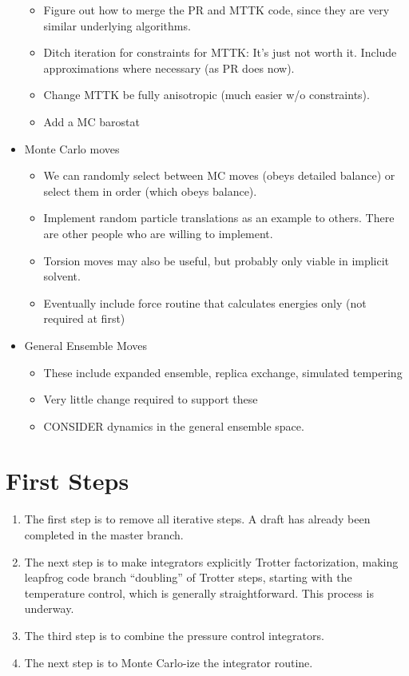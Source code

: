 \documentclass[11pt,a4paper,twoside]{article}
\begin{document}
\begin{itemize}
\begin{itemize}
     \item Figure out how to merge the PR and MTTK code, since they are very similar underlying algorithms.
     \item Ditch iteration for constraints for MTTK: It's just not
       worth it. Include approximations where necessary (as PR does
       now).
     \item Change MTTK be fully anisotropic (much easier w/o constraints).  
     \item Add a MC barostat
   \end{itemize}
\item Monte Carlo moves 
  \begin{itemize}
    \item We can randomly select between MC moves (obeys detailed balance)
      or select them in order (which obeys balance).
    \item Implement random particle translations as an example to others.
      There are other people who are willing to implement.
    \item Torsion moves may also be useful, but probably only viable in implicit solvent.
   \item Eventually include force routine that calculates energies only (not required at first)
   \end{itemize}
\item General Ensemble Moves
  \begin{itemize}
      \item These include expanded ensemble, replica exchange, simulated tempering
      \item Very little change required to support these
      \item CONSIDER dynamics in the general ensemble space.
   \end{itemize}
\end{itemize}
\section{First Steps}

\begin{enumerate}
\item The first step is to remove all iterative steps.  A draft has already
been completed in the master branch.
\item The next step is to make integrators explicitly Trotter
  factorization, making leapfrog code branch ``doubling'' of Trotter
  steps, starting with the temperature control, which is generally
  straightforward.  This process is underway.
\item The third step is to combine the pressure control integrators.
\item The next step is to Monte Carlo-ize the integrator routine. 
\end{enumerate}
\end{document}
